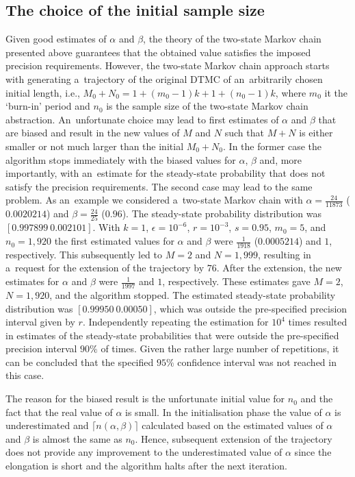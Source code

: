 \documentclass[runningheads,a4paper]{llncs}
\begin{document}
\subsection{The choice of the initial sample size}
Given good estimates of $\alpha$ and $\beta$, the theory of the two-state Markov chain presented
above guarantees that the obtained value satisfies the imposed precision requirements.
However, the two-state Markov chain approach starts with generating a~trajectory of the original
DTMC of an~arbitrarily chosen initial length, i.e., $M_0 + N_0 = 1+(m_0-1)k + 1+(n_0-1)k$, where
$m_0$ it the `burn-in' period and $n_0$ is the sample size of the two-state Markov chain
abstraction. An~unfortunate choice may lead to first estimates of $\alpha$ and $\beta$ that are
biased and result in the new values of $M$ and $N$ such that $M+N$ is either smaller or not much
larger than the initial $M_0+N_0$. In the former case the algorithm stops immediately with the
biased values for $\alpha$, $\beta$ and, more importantly, with an~estimate for the steady-state
probability that does not satisfy the precision requirements. The second case may lead to the same
problem. As an~example we considered a~two-state Markov chain with $\alpha=\frac{24}{11873}$
($0.0020214$) and $\beta=\frac{24}{25}$ ($0.96$). The steady-state probability distribution was
$[0.997899\ 0.002101]$. With $k=1$, $\epsilon = 10^{-6}$, $r = 10^{-3}$, $s = 0.95$, $m_0 = 5$,
and $n_0 = 1,920$ the first estimated values for $\alpha$ and $\beta$ were $\frac{1}{1918}$
($0.0005214$) and $1$, respectively. This subsequently led to $M=2$ and $N=1,999$, resulting in
a~request for the extension of the trajectory by $76$. After the extension, the new estimates for
$\alpha$ and $\beta$ were $\frac{1}{1997}$ and $1$, respectively. These estimates gave $M=2$,
$N=1,920$, and the algorithm stopped. The estimated steady-state probability distribution was
$[0.99950\ 0.00050]$, which was outside the pre-specified precision interval given by $r$.
Independently repeating the estimation for $10^{4}$ times resulted in estimates of the
steady-state probabilities that were outside the pre-specified precision interval $90\%$ of times.
Given the rather large number of repetitions, it can be concluded that the specified $95\%$
confidence interval was not reached in this case.

The reason for the biased result is the unfortunate initial value for $n_0$ and the fact that
the real value of $\alpha$ is small. In the initialisation phase the value of $\alpha$
is underestimated and $\lceil n(\alpha,\beta)\rceil$ calculated based on the estimated values of
$\alpha$ and $\beta$ is almost the same as $n_0$. Hence, subsequent extension of the trajectory
does not provide any improvement to the underestimated value of $\alpha$ since the elongation is
short and the algorithm halts after the next iteration.
\end{document}

